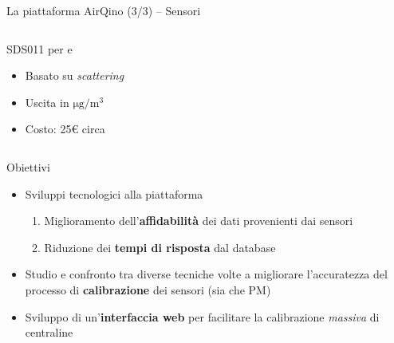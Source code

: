 \begin{frame}[t]{La piattaforma AirQino (3/3) – Sensori}
\begin{columns}
\begin{column}{0.5\textwidth}
\begin{center}
\begin{block}{SDS011 per  e }
\begin{figure}[H]
    \centering
\end{figure}
\vspace{0.1cm}
\begin{itemize}
  \item Basato su \textit{scattering}
  \item Uscita in $\mathrm{\si{\micro}g/m^3}$
  \item Costo: 25€ circa
\end{itemize}
\vspace{0.1cm}

\end{block}
\end{center}
\end{column}

\end{columns}
\end{frame}

\begin{frame}{Obiettivi}
\begin{itemize}
  \item Sviluppi tecnologici alla piattaforma
  \begin{enumerate}
    \item Miglioramento dell'\textbf{affidabilità} dei dati provenienti dai sensori
    \item Riduzione dei \textbf{tempi di risposta} dal database
  \end{enumerate}\vspace{0.3cm}
  \item Studio e confronto tra diverse tecniche volte a migliorare l’accuratezza del processo di \textbf{calibrazione} dei sensori (sia  che PM)\vspace{0.3cm}
  \item Sviluppo di un’\textbf{interfaccia web} per facilitare la calibrazione \textit{massiva} di centraline
\end{itemize}
\end{frame}


